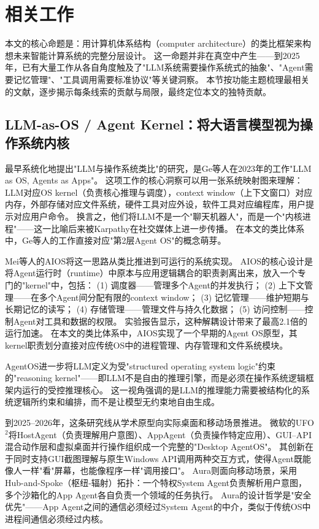 \section{相关工作}
\label{sec:related}

本文的核心命题是：用计算机体系结构（computer architecture）的类比框架来构想未来智能计算系统的完整分层设计。
这一命题并非在真空中产生——到2025年，已有大量工作从各自角度触及了"LLM系统需要操作系统式的抽象"、"Agent需要记忆管理"、"工具调用需要标准协议"等关键洞察。
本节按功能主题梳理最相关的文献，逐步揭示每条线索的贡献与局限，最终定位本文的独特贡献。

\subsection{LLM-as-OS / Agent Kernel：将大语言模型视为操作系统内核}
\label{sec:related-llmos}

最早系统化地提出"LLM与操作系统类比"的研究，是Ge等人在2023年的工作"LLM as OS, Agents as Apps"\cite{ge2023llmos}。
这项工作的核心洞察可以用一张系统映射图来理解：LLM对应OS kernel（负责核心推理与调度），context window（上下文窗口）对应内存，外部存储对应文件系统，硬件工具对应外设，软件工具对应编程库，用户提示对应用户命令。
换言之，他们将LLM不是一个"聊天机器人"，而是一个"内核进程"——这一比喻后来被Karpathy在社交媒体上进一步传播\cite{karpathy2023llmos}。
在本文的类比体系中，Ge等人的工作直接对应"第2层Agent OS"的概念萌芽。

Mei等人的AIOS\cite{mei2024aios}将这一思路从类比推进到可运行的系统实现。
AIOS的核心设计是将Agent运行时（runtime）中原本与应用逻辑耦合的职责剥离出来，放入一个专门的"kernel"中，包括：
(1) 调度器——管理多个Agent的并发执行；
(2) 上下文管理——在多个Agent间分配有限的context window；
(3) 记忆管理——维护短期与长期记忆的读写；
(4) 存储管理——管理文件与持久化数据；
(5) 访问控制——控制Agent对工具和数据的权限。
实验报告显示，这种解耦设计带来了最高2.1倍的运行加速。
在本文的类比体系中，AIOS实现了一个早期的Agent OS原型，其kernel职责划分直接对应传统OS中的进程管理、内存管理和文件系统模块。

AgentOS\cite{agentos2025}进一步将LLM定义为受"structured operating system logic"约束的"reasoning kernel"——即LLM不是自由的推理引擎，而是必须在操作系统逻辑框架内运行的受控推理核心。
这一视角强调的是LLM的推理能力需要被结构化的系统逻辑所约束和编排，而不是让模型无约束地自由生成。

到2025--2026年，这条研究线从学术原型向实际桌面和移动场景推进。
微软的UFO$^2$\cite{ufo2_2025}将HostAgent（负责理解用户意图）、AppAgent（负责操作特定应用）、GUI--API混合动作层和虚拟桌面并行操作组织成一个完整的"Desktop AgentOS"。
其创新在于同时支持GUI截图理解与原生Windows API调用两种交互方式，使得Agent既能像人一样"看"屏幕，也能像程序一样"调用接口"。
Aura\cite{aura2025}则面向移动场景，采用Hub-and-Spoke（枢纽-辐射）拓扑：一个特权System Agent负责解析用户意图，多个沙箱化的App Agent各自负责一个领域的任务执行。
Aura的设计哲学是"安全优先"——App Agent之间的通信必须经过System Agent的中介，类似于传统OS中进程间通信必须经过内核。

